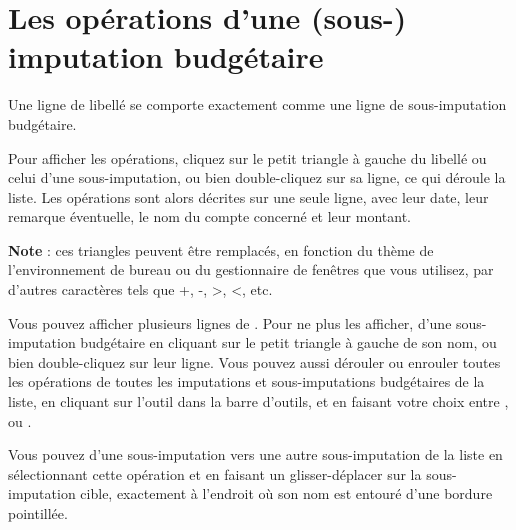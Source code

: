 \section{Les opérations d'une (sous-) imputation budgétaire\label{budgetarylines-transactions}}


Une ligne de libellé  se comporte exactement comme une ligne de sous-imputation budgétaire.

Pour afficher les opérations, cliquez sur le petit triangle à gauche du libellé   ou celui d'une sous-imputation, ou bien double-cliquez sur sa ligne,
 ce qui déroule la liste. Les opérations sont alors décrites sur une seule ligne, avec leur date, leur remarque éventuelle, le nom du compte concerné et leur montant.

\textbf{Note} : ces triangles peuvent être remplacés, en fonction du thème de l'environnement de bureau ou du gestionnaire de fenêtres que vous utilisez, par d'autres caractères tels que +, -, >, <, etc. 


Vous pouvez afficher plusieurs lignes de . Pour ne plus les afficher,  d'une sous-imputation budgétaire en cliquant sur le petit triangle à gauche de son nom, ou bien double-cliquez sur leur ligne. Vous pouvez aussi dérouler ou enrouler toutes les opérations de toutes les imputations et sous-imputations budgétaires de la liste, en cliquant sur l'outil  dans la barre d'outils, et en faisant votre choix entre ,  ou .

Vous pouvez  d'une sous-imputation vers une autre sous-imputation de la liste en sélectionnant cette opération et en faisant un glisser-déplacer sur la sous-imputation cible, exactement à l'endroit où son nom est entouré d'une bordure pointillée.

